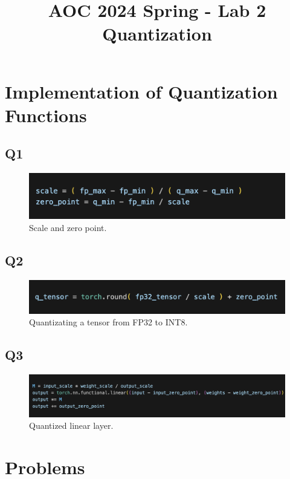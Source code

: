 \documentclass[12pt]{article}
\title{\Large AOC 2024 Spring - Lab 2 Quantization}
\begin{document}
\maketitle

\section{Implementation of Quantization Functions}

\subsection*{Q1}
\begin{figure}[h]
    \centering
    \includegraphics[width=0.9\linewidth]{./images/lab2_q1.png}
    \caption{Scale and zero point.}
\end{figure}

\subsection*{Q2}
\begin{figure}[h]
    \centering
    \includegraphics[width=0.9\linewidth]{./images/lab2_q2.png}
    \caption{Quantizating a tensor from FP32 to INT8.}
\end{figure}

\subsection*{Q3}
\begin{figure}[h]
    \centering
    \includegraphics[width=0.9\linewidth]{./images/lab2_q3.png}
    \caption{Quantized linear layer.}
\end{figure}

\section{Problems}
\end{document}
